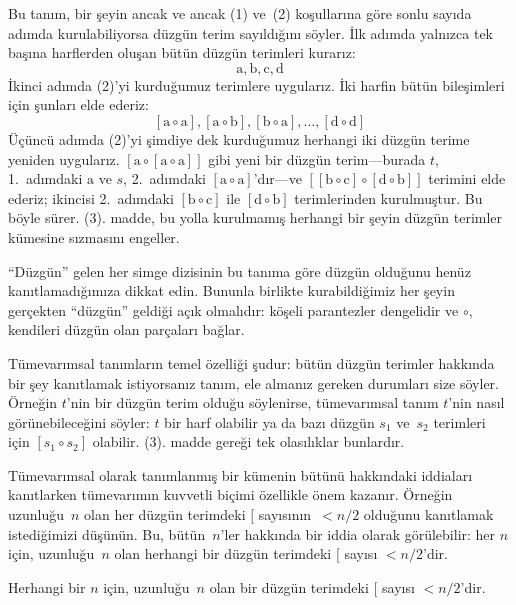 \documentclass[../../../include/open-logic-section]{subfiles}
\begin{document}
Bu tanım, bir şeyin ancak ve ancak (1) ve~(2) koşullarına göre sonlu
sayıda adımda kurulabiliyorsa düzgün terim sayıldığını söyler. İlk
adımda yalnızca tek başına harflerden oluşan bütün düzgün terimleri
kurarız:
\[
\mathrm{a}, \mathrm{b}, \mathrm{c}, \mathrm{d}
\]
İkinci adımda (2)'yi kurduğumuz terimlere uygularız. İki harfin bütün
bileşimleri için şunları elde ederiz:
\[
[\mathrm{a} \circ \mathrm{a}], [\mathrm{a} \circ \mathrm{b}],
[\mathrm{b} \circ \mathrm{a}], \dots, [\mathrm{d} \circ \mathrm{d}]
\]
Üçüncü adımda (2)'yi şimdiye dek kurduğumuz herhangi iki düzgün terime
yeniden uygularız. $[\mathrm{a} \circ [\mathrm{a} \circ \mathrm{a}]]$
gibi yeni bir düzgün terim---burada $t$, 1.~adımdaki $\mathrm{a}$ ve
$s$, 2.~adımdaki $[\mathrm{a} \circ \mathrm{a}]$'dır---ve $[[\mathrm{b}
\circ \mathrm{c}] \circ [\mathrm{d} \circ \mathrm{b}]]$ terimini elde
ederiz; ikincisi 2.~adımdaki $[\mathrm{b} \circ \mathrm{c}]$ ile
$[\mathrm{d} \circ \mathrm{b}]$ terimlerinden kurulmuştur.
Bu böyle sürer. (3). madde, bu yolla kurulmamış herhangi bir şeyin
düzgün terimler kümesine sızmasını engeller.

``Düzgün'' gelen her simge dizisinin bu tanıma göre düzgün olduğunu
henüz kanıtlamadığımıza dikkat edin. Bununla birlikte kurabildiğimiz
her şeyin gerçekten ``düzgün'' geldiği açık olmalıdır: köşeli
parantezler dengelidir ve $\circ$, kendileri düzgün olan parçaları
bağlar.

Tümevarımsal tanımların temel özelliği şudur: bütün düzgün terimler
hakkında bir şey kanıtlamak istiyorsanız tanım, ele almanız gereken
durumları size söyler. Örneğin $t$'nin bir düzgün terim olduğu
söylenirse, tümevarımsal tanım $t$'nin nasıl görünebileceğini söyler:
$t$ bir harf olabilir ya da bazı düzgün $s_1$ ve~$s_2$ terimleri için
$[s_1 \circ s_2]$ olabilir. (3). madde gereği tek olasılıklar bunlardır.

Tümevarımsal olarak tanımlanmış bir kümenin bütünü hakkındaki iddiaları
kanıtlarken tümevarımın kuvvetli biçimi özellikle önem kazanır. Örneğin
uzunluğu~$n$ olan her düzgün terimdeki $[$ sayısının~$< n/2$ olduğunu
kanıtlamak istediğimizi düşünün. Bu, bütün~$n$'ler hakkında bir iddia
olarak görülebilir: her $n$ için, uzunluğu~$n$ olan herhangi bir düzgün
terimdeki $[$ sayısı $< n/2$'dir.

\begin{prop}
  Herhangi bir $n$ için, uzunluğu~$n$ olan bir düzgün terimdeki $[$
  sayısı $< n/2$'dir.
\end{prop}
\end{document}

